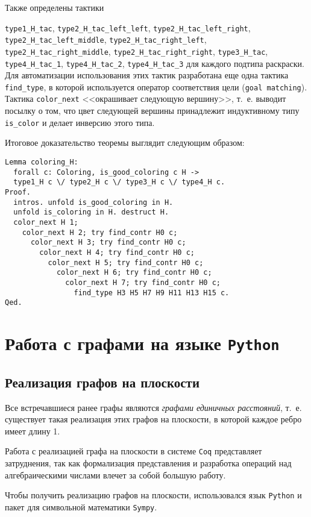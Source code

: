 Также определены тактики 

{\tt type1\_H\_tac}, {\tt type2\_H\_tac\_left\_left}, {\tt type2\_H\_tac\_left\_right}, {\tt type2\_H\_tac\_left\_middle}, {\tt type2\_H\_tac\_right\_left}, {\tt type2\_H\_tac\_right\_middle}, {\tt type2\_H\_tac\_right\_right}, {\tt type3\_H\_tac}, {\tt type4\_H\_tac\_1}, {\tt type4\_H\_tac\_2}, {\tt type4\_H\_tac\_3} для каждого подтипа раскраски. Для автоматизации использования этих тактик разработана еще одна тактика {\tt find\_type}, в которой используется оператор соответствия цели ({\tt goal matching}). Тактика {\tt color\_next} <<окрашивает следующую вершину>>, т.~е. выводит посылку о том, что цвет следующей вершины принадлежит индуктивному типу {\tt is\_color} и делает инверсию этого типа.

Итоговое доказательство теоремы выглядит следующим образом:

\begin{verbatim}
Lemma coloring_H:
  forall c: Coloring, is_good_coloring c H ->
  type1_H c \/ type2_H c \/ type3_H c \/ type4_H c.
Proof.
  intros. unfold is_good_coloring in H. 
  unfold is_coloring in H. destruct H.
  color_next H 1;
    color_next H 2; try find_contr H0 c;
      color_next H 3; try find_contr H0 c;
        color_next H 4; try find_contr H0 c;
          color_next H 5; try find_contr H0 c;
            color_next H 6; try find_contr H0 c;
              color_next H 7; try find_contr H0 c;
                find_type H3 H5 H7 H9 H11 H13 H15 c.
Qed.
\end{verbatim}

\chapter{Работа с графами на языке {\tt Python}}
\section{Реализация графов на плоскости}
Все встречавшиеся ранее графы являются {\it графами единичных расстояний}, т.~е. существует такая реализация этих графов на плоскости, в которой каждое ребро имеет длину 1.

Работа с реализацией графа на плоскости в системе {\tt Coq} представляет затруднения, так как формализация представления и разработка операций над алгебраическими числами влечет за собой большую работу.

Чтобы получить реализацию графов на плоскости, использовался язык {\tt Python} и пакет для символьной математики {\tt Sympy}.

